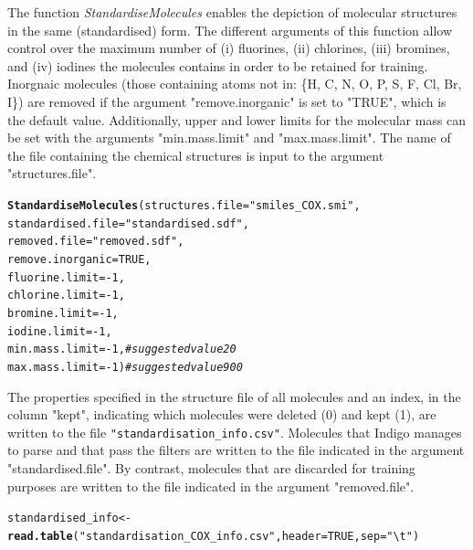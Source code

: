 \documentclass[twoside,a4wide,12pt]{article}\usepackage[]{graphicx}\usepackage[]{color}
\makeatletter
\newcommand{\hlnum}[1]{\textcolor[rgb]{0.686,0.059,0.569}{#1}}%
\newcommand{\hlstr}[1]{\textcolor[rgb]{0.192,0.494,0.8}{#1}}%
\newcommand{\hlcom}[1]{\textcolor[rgb]{0.678,0.584,0.686}{\textit{#1}}}%
\newcommand{\hlopt}[1]{\textcolor[rgb]{0,0,0}{#1}}%
\newcommand{\hlstd}[1]{\textcolor[rgb]{0.345,0.345,0.345}{#1}}%
\newcommand{\hlkwb}[1]{\textcolor[rgb]{0.69,0.353,0.396}{#1}}%
\newcommand{\hlkwc}[1]{\textcolor[rgb]{0.333,0.667,0.333}{#1}}%
\newcommand{\hlkwd}[1]{\textcolor[rgb]{0.737,0.353,0.396}{\textbf{#1}}}%
\newenvironment{kframe}{%
 \def\at@end@of@kframe{}%
 \ifinner\ifhmode%
  \def\at@end@of@kframe{\end{minipage}}%
  \begin{minipage}{\columnwidth}%
 \fi\fi%
 \def\FrameCommand##1{\hskip\@totalleftmargin \hskip-\fboxsep
 \colorbox{shadecolor}{##1}\hskip-\fboxsep
     \hskip-\linewidth \hskip-\@totalleftmargin \hskip\columnwidth}%
 \MakeFramed {\advance\hsize-\width
   \@totalleftmargin\z@ \linewidth\hsize
   \@setminipage}}%
 {\par\unskip\endMakeFramed%
 \at@end@of@kframe}
\newenvironment{knitrout}{}{} %
\makeatother
\begin{document}
The function {\it StandardiseMolecules} enables the depiction of molecular structures in the same (standardised) form.
The different arguments of this function allow control over the maximum number of (i) fluorines, (ii) chlorines,
(iii) bromines, and (iv) iodines the molecules contains in order to be retained for training.
Inorgnaic molecules (those containing atoms not in: \{H, C, N, O, P, S, F, Cl, Br, I\}) are removed if the argument "remove.inorganic" is set to "TRUE", which is the default value.
Additionally, upper and lower limits for the molecular mass can be set with the arguments "min.mass.limit" and "max.mass.limit".
The name of the file containing the chemical structures is input to the argument "structures.file".
\begin{knitrout}
\color{fgcolor}\begin{kframe}
\begin{alltt}
\hlkwd{StandardiseMolecules}\hlstd{(}\hlkwc{structures.file}\hlstd{=}\hlstr{"smiles_COX.smi"}\hlstd{,}
\hlkwc{standardised.file}\hlstd{=}\hlstr{"standardised.sdf"}\hlstd{,}
\hlkwc{removed.file}\hlstd{=}\hlstr{"removed.sdf"}\hlstd{,}
\hlkwc{remove.inorganic}\hlstd{=}\hlnum{TRUE}\hlstd{,}
\hlkwc{fluorine.limit}\hlstd{=}\hlopt{-}\hlnum{1}\hlstd{,}
\hlkwc{chlorine.limit}\hlstd{=}\hlopt{-}\hlnum{1}\hlstd{,}
\hlkwc{bromine.limit}\hlstd{=}\hlopt{-}\hlnum{1}\hlstd{,}
\hlkwc{iodine.limit}\hlstd{=}\hlopt{-}\hlnum{1}\hlstd{,}
\hlkwc{min.mass.limit}\hlstd{=}\hlopt{-}\hlnum{1}\hlstd{,} \hlcom{#suggested value 20}
\hlkwc{max.mass.limit}\hlstd{=}\hlopt{-}\hlnum{1}\hlstd{)} \hlcom{#suggested value  900}
\end{alltt}
\end{kframe}
\end{knitrout}
The properties specified in the structure file of all molecules and an index, in the column "kept", indicating which molecules were deleted (0) and kept (1),
are written to the file \verb|"standardisation_info.csv"|.
Molecules that Indigo manages to parse and that pass the filters are written to the file indicated in the argument "standardised.file".
By contrast, molecules that are discarded for training purposes are written to the file indicated in the argument "removed.file".

\begin{knitrout}
\color{fgcolor}\begin{kframe}
\begin{alltt}
\hlstd{standardised_info} \hlkwb{<-} \hlkwd{read.table}\hlstd{(}\hlstr{"standardisation_COX_info.csv"}\hlstd{,}\hlkwc{header}\hlstd{=}\hlnum{TRUE}\hlstd{,}\hlkwc{sep}\hlstd{=}\hlstr{"\textbackslash{}t"}\hlstd{)}
\end{alltt}
\end{kframe}
\end{knitrout}
\end{document}
